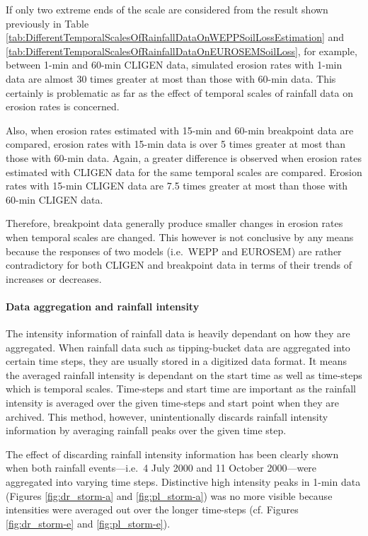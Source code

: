 If only two extreme ends of the scale are considered from the result shown
previously in Table
\ref{tab:DifferentTemporalScalesOfRainfallDataOnWEPPSoilLossEstimation} and
\ref{tab:DifferentTemporalScalesOfRainfallDataOnEUROSEMSoilLoss}, for example,
between 1-min and 60-min CLIGEN data, simulated erosion rates with 1-min data
are almost 30 times greater at most than those with 60-min data. This certainly
is problematic as far as the effect of temporal scales of rainfall data on
erosion rates is concerned.

Also, when erosion rates estimated with 15-min and
60-min breakpoint data are compared, erosion rates with 15-min data is over 5
times greater at most than those with 60-min data. Again, a greater difference
is observed when erosion rates estimated with CLIGEN data for the same temporal
scales are compared. Erosion rates with 15-min CLIGEN data are 7.5 times greater
at most than those with 60-min CLIGEN data.

Therefore, breakpoint data generally produce smaller changes in erosion rates
when temporal scales are changed. This however is not conclusive by any means
because the responses of two models (i.e.\ WEPP and EUROSEM) are rather
contradictory for both CLIGEN and breakpoint data in terms of their trends of
increases or decreases.

\paragraph{Data aggregation and rainfall intensity} The intensity information
of rainfall data is heavily dependant on how they are aggregated. When rainfall
data such as tipping-bucket data are aggregated into certain time steps, they
are usually stored in a digitized data format. It means the averaged rainfall
intensity is dependant on the start time as well as time-steps which is temporal
scales. Time-steps and start time are important as the rainfall intensity is
averaged over the given time-steps and start point when they are archived. This
method, however, unintentionally discards rainfall intensity information by
averaging rainfall peaks over the given time step.

The effect of discarding rainfall intensity information has been clearly shown
when both rainfall events---i.e.\ 4 July 2000 and 11 October 2000---were
aggregated into varying time steps. Distinctive high intensity peaks in 1-min
data (Figures \ref{fig:dr_storm-a} and \ref{fig:pl_storm-a}) was no more visible
because intensities were averaged out over the longer time-steps (cf. Figures
\ref{fig:dr_storm-e} and \ref{fig:pl_storm-e}).

